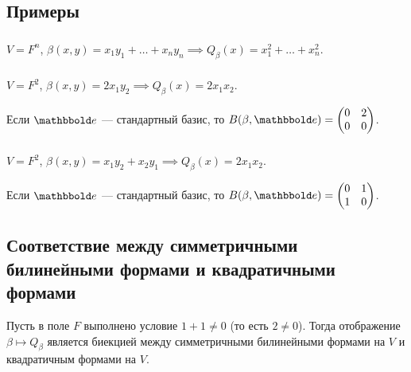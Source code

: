 \subsection{Примеры}

\subsubsection{}

$V = F^n$, $\beta(x, y) = x_1 y_1 + \dots + x_n y_n \implies Q_\beta(x) = x_1^2 + \dots + x_n^2$.

\subsubsection{}

$V = F^2$, $\beta(x, y) = 2x_1 y_2 \implies Q_\beta(x) = 2x_1 x_2$.

Если $\E$ --- стандартный базис, то $B(\beta, \E) = \begin{pmatrix} 0 & 2 \\ 0 & 0 \end{pmatrix}$.

\subsubsection{}

$V = F^2$, $\beta(x, y) = x_1 y_2 + x_2 y_1 \implies Q_\beta(x) = 2x_1 x_2$.

Если $\E$ --- стандартный базис, то $B(\beta, \E) = \begin{pmatrix} 0 & 1 \\ 1 & 0 \end{pmatrix}$.


\subsection{Соответствие между симметричными билинейными формами и квадратичными формами}

\begin{proposal}
    Пусть в поле $F$ выполнено условие $1 + 1 \neq 0$ (то есть $2 \neq 0$). Тогда отображение $\beta \mapsto Q_\beta$ является биекцией между симметричными билинейными формами на $V$ и квадратичным формами на $V$.
\end{proposal}


